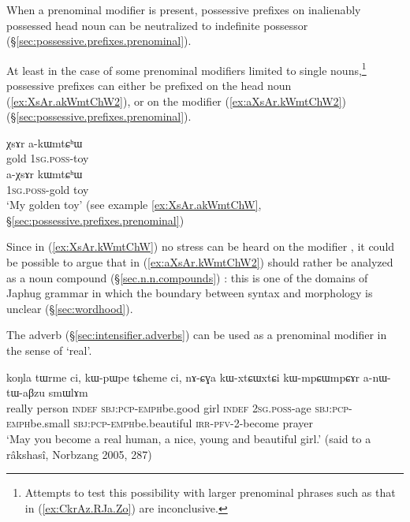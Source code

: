 When a prenominal modifier is present, possessive prefixes on inalienably possessed head noun can be neutralized to indefinite possessor  (§\ref{sec:possessive.prefixes.prenominal}). 

At least in the case of some prenominal modifiers limited to single nouns,\footnote{Attempts to test this possibility with larger prenominal phrases such as that in (\ref{ex:CkrAz.RJa.Zo}) are inconclusive. } possessive prefixes can either be prefixed on the head noun (\ref{ex:XsAr.akWmtChW2}), or on the modifier (\ref{ex:aXsAr.kWmtChW2}) (§\ref{sec:possessive.prefixes.prenominal}).

\begin{exe}
\ex \label{ex:XsAr.kWmtChW}
\begin{xlist}
\ex \label{ex:XsAr.akWmtChW2}
\gll χsɤr a-kɯmtɕʰɯ \\
gold \textsc{1sg}.\textsc{poss}-toy \\
\ex \label{ex:aXsAr.kWmtChW2}
\gll a-χsɤr kɯmtɕʰɯ \\
\textsc{1sg}.\textsc{poss}-gold toy  \\
\glt `My golden toy' (see example \ref{ex:XsAr.akWmtChW}, §\ref{sec:possessive.prefixes.prenominal})
\end{xlist}
\end{exe}

Since in (\ref{ex:XsAr.kWmtChW}) no stress can be heard on the modifier , it could be possible to argue that  in  (\ref{ex:aXsAr.kWmtChW2}) should rather be analyzed as a noun compound (§\ref{sec.n.n.compounds}) : this is one of the domains of Japhug grammar in which the boundary between syntax and morphology is unclear (§\ref{sec:wordhood}).

The adverb  (§\ref{sec:intensifier.adverbs}) can be used as a prenominal modifier in the sense of `real'.

\begin{exe}
\ex \label{ex:koNla.tWrme}
\gll koŋla tɯrme ci, kɯ-pɯ\redp{}pe tɕheme ci,  nɤ-ɕɣa kɯ-xtɕɯ\redp{}xtɕi kɯ-mpɕɯ\redp{}mpɕɤr a-nɯ-tɯ-aβzu smɯlɤm \\
really person \textsc{indef} \textsc{sbj}:\textsc{pcp}-\textsc{emph}\redp{}be.good girl \textsc{indef} \textsc{2sg}.\textsc{poss}-age \textsc{sbj}:\textsc{pcp}-\textsc{emph}\redp{}be.small \textsc{sbj}:\textsc{pcp}-\textsc{emph}\redp{}be.beautiful \textsc{irr}-\textsc{pfv}-2-become prayer \\
\glt `May you become a real human, a nice, young and beautiful girl.' (said to a râkshasî, Norbzang 2005, 287)
\end{exe}

